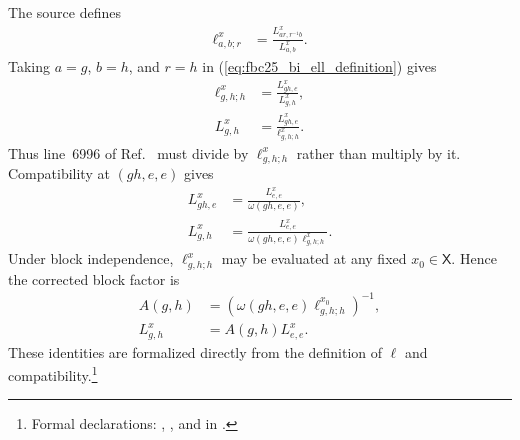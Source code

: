 \documentclass{article}
\begin{document}
The source defines
\begin{align}
    \ell^x_{a,b;r}
        &=\frac{L^x_{ar,r^{-1}b}}{L^x_{a,b}}.
    \label{eq:fbc25_bi_ell_definition}
\end{align}
Taking $a=g$, $b=h$, and $r=h$ in
(\ref{eq:fbc25_bi_ell_definition}) gives
\begin{align}
    \ell^x_{g,h;h}
        &=\frac{L^x_{gh,e}}{L^x_{g,h}},
    \label{eq:fbc25_bi_ell_specialization}\\
    L^x_{g,h}
        &=\frac{L^x_{gh,e}}{\ell^x_{g,h;h}}.
    \label{eq:fbc25_bi_ell_solved}
\end{align}
Thus line~6996 of Ref.~\cite{FrancoRubio2025MPUGauging} must divide by
$\ell^x_{g,h;h}$ rather than multiply by it. Compatibility at
$(gh,e,e)$ gives
\begin{align}
    L^x_{gh,e}
        &=\frac{L^x_{e,e}}{\omega(gh,e,e)},
    \label{eq:fbc25_bi_right_identity}\\
    L^x_{g,h}
        &=\frac{L^x_{e,e}}
        {\omega(gh,e,e)\ell^x_{g,h;h}}.
    \label{eq:fbc25_bi_corrected_factorization}
\end{align}
Under block independence, $\ell^x_{g,h;h}$ may be evaluated at any fixed
$x_0\in\mathsf X$. Hence the corrected block factor is
\begin{align}
    A(g,h)
        &=(\omega(gh,e,e)\ell^{x_0}_{g,h;h})^{-1},
    \label{eq:fbc25_bi_block_factor}\\
    L^x_{g,h}
        &=A(g,h)L^x_{e,e}.
    \label{eq:fbc25_bi_factorized_lsymbol}
\end{align}
These identities are formalized directly from the definition of $\ell$ and
compatibility.\footnote{Formal declarations:
,
, and
 in
.}
\end{document}
